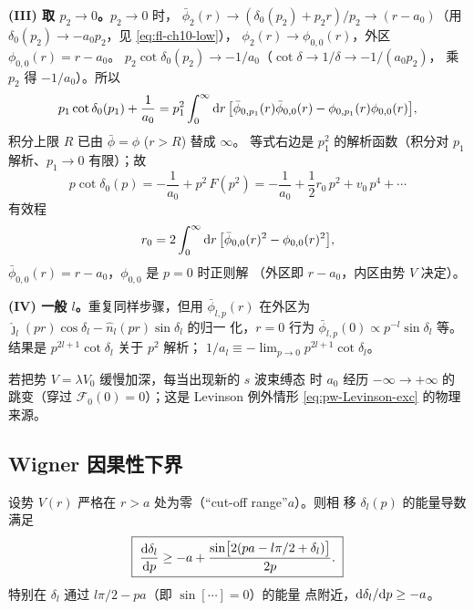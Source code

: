 \begin{proof*}[证明]
\textbf{(III) 取 $p_2\to 0$。}$p_2\to0$ 时，
$\bar\phi_2(r)\to(\delta_0(p_2)+p_2 r)/p_2\to(r-a_0)$（用
$\delta_0(p_2)\to -a_0 p_2$，见 \eqref{eq:fl-ch10-low}），
$\phi_2(r)\to\phi_{0,0}(r)$，外区 $\phi_{0,0}(r)=r-a_0$。
$p_2\cot\delta_0(p_2)\to -1/a_0$（$\cot\delta\to 1/\delta\to-1/(a_0 p_2)$，
乘 $p_2$ 得 $-1/a_0$）。所以
\begin{equation}\label{eq:pw-eff-final}
p_1\cot\delta_0(p_1)+\frac{1}{a_0}
= p_1^2\int_0^\infty\mathrm{d} r\,
\bigl[\bar\phi_{0,p_1}(r)\bar\phi_{0,0}(r)-\phi_{0,p_1}(r)\phi_{0,0}(r)\bigr],
\end{equation}
积分上限 $R$ 已由 $\bar\phi=\phi$ ($r>R$) 替成 $\infty$。
等式右边是 $p_1^2$ 的解析函数（积分对 $p_1$ 解析、$p_1\to0$
有限）；故
\[
p\cot\delta_0(p)=-\frac{1}{a_0}+p^2\,F(p^2)
=-\frac{1}{a_0}+\frac{1}{2}r_0\,p^2+v_0\,p^4+\cdots
\]
有效程
\begin{equation}\label{eq:pw-r0}
r_0=2\int_0^\infty\mathrm{d} r\,
\bigl[\bar\phi_{0,0}(r)^2-\phi_{0,0}(r)^2\bigr],
\end{equation}
$\bar\phi_{0,0}(r)=r-a_0$，$\phi_{0,0}$ 是 $p=0$ 时正则解
（外区即 $r-a_0$，内区由势 $V$ 决定）。

\textbf{(IV) 一般 $l$。}重复同样步骤，但用
$\bar\phi_{l,p}(r)$ 在外区为
$\hat\jmath_l(pr)\cos\delta_l-\hat n_l(pr)\sin\delta_l$ 的归一
化，$r=0$ 行为 $\bar\phi_{l,p}(0)\propto p^{-l}\sin\delta_l$
等。结果是 $p^{2l+1}\cot\delta_l$ 关于 $p^2$ 解析；
$1/a_l\equiv -\lim_{p\to 0}p^{2l+1}\cot\delta_l$。\hfill
\end{proof*}

\begin{remark}
若把势 $V=\lambda V_0$ 缓慢加深，每当出现新的 $s$ 波束缚态
时 $a_0$ 经历 $-\infty\to+\infty$ 的跳变（穿过
$\mathcal F_0(0)=0$）；这是 Levinson 例外情形 \eqref{eq:pw-Levinson-exc}
的物理来源。
\end{remark}

\subsection{Wigner 因果性下界}\label{sec:pw-Wigner}

\begin{theorem}[Wigner 1955]\label{thm:pw-Wigner}
设势 $V(r)$ 严格在 $r>a$ 处为零（“cut-off range”$a$）。则相
移 $\delta_l(p)$ 的能量导数满足
\begin{equation}\label{eq:pw-Wigner}
\boxed{\;\frac{\mathrm{d}\delta_l}{\mathrm{d} p}\ge -a+\frac{\sin\bigl[2(pa-l\pi/2+\delta_l)\bigr]}{2p}.\;}
\end{equation}
特别在 $\delta_l$ 通过 $l\pi/2-pa$（即 $\sin[\cdots]=0$）的能量
点附近，$\mathrm{d}\delta_l/\mathrm{d} p\ge -a$。
\end{theorem}

